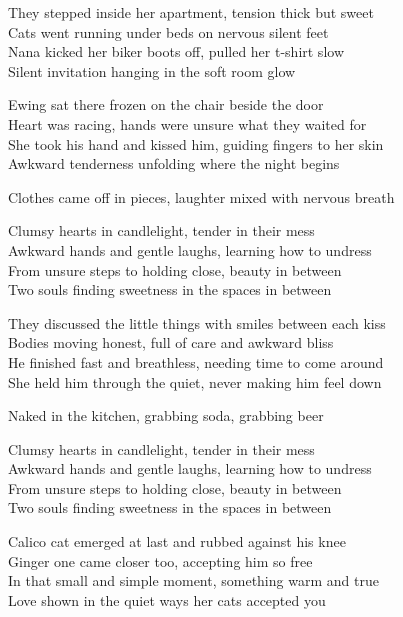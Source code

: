 \begin{lyrics}
They stepped inside her apartment, tension thick but sweet\\  
Cats went running under beds on nervous silent feet\\  
Nana kicked her biker boots off, pulled her t-shirt slow\\  
Silent invitation hanging in the soft room glow  

Ewing sat there frozen on the chair beside the door\\  
Heart was racing, hands were unsure what they waited for\\  
She took his hand and kissed him, guiding fingers to her skin\\  
Awkward tenderness unfolding where the night begins  

Clothes came off in pieces, laughter mixed with nervous breath  

Clumsy hearts in candlelight, tender in their mess\\  
Awkward hands and gentle laughs, learning how to undress\\  
From unsure steps to holding close, beauty in between\\  
Two souls finding sweetness in the spaces in between  

They discussed the little things with smiles between each kiss\\  
Bodies moving honest, full of care and awkward bliss\\  
He finished fast and breathless, needing time to come around\\  
She held him through the quiet, never making him feel down  

Naked in the kitchen, grabbing soda, grabbing beer  

Clumsy hearts in candlelight, tender in their mess\\  
Awkward hands and gentle laughs, learning how to undress\\  
From unsure steps to holding close, beauty in between\\  
Two souls finding sweetness in the spaces in between  

Calico cat emerged at last and rubbed against his knee\\  
Ginger one came closer too, accepting him so free\\  
In that small and simple moment, something warm and true\\  
Love shown in the quiet ways her cats accepted you  


\end{lyrics}
